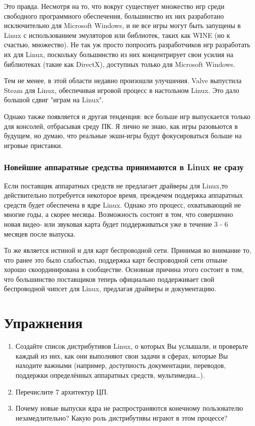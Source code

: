 \documentclass[10pt]{book}
\begin{document}
Это правда. Несмотря на то, что вокруг существует множество игр среди свободного программного обеспечения, большинство их них разработано исключительно для Microsoft Windows, и не все игры могут быть запущены в Linux с использованием эмуляторов или библиотек, таких как WINE (но к счастью, множество). Не так уж просто попросить разработчиков игр разработать их для Linux, поскольку большинство из них концентрирует свои усилия на библиотеках (такие как DirectX), доступных только для Microsoft Windows.

Тем не менее, в этой области недавно произошли улучшения. Valve выпустила Steam для Linux, обеспечивая игровой процесс в настольном Linux. Это дало большой сдвиг "играм на Linux".

Однако также появляется и другая тенденция: все больше игр  выпускается только для консолей, отбрасывая среду ПК. Я лично не знаю, как игры разовьются в будущем, но думаю, что реальные экшн-игры будут фокусироваться больше на игровые приставки.

\subsubsection{Новейшие аппаратные средства принимаются в Linux не сразу}

Если поставщик аппаратных средств не предлагает драйверы для Linux,\quad то действительно потребуется некоторое время, прежде\quad чем поддержка аппаратных средств будет обеспечена в ядре Linux. Однако это процесс, охватывающий не многие годы, а скорее месяцы. Возможность состоит в том, что совершенно новая видео- или звуковая карта будет поддерживаться уже в течение 3 - 6 месяцев после выпуска.

То же является истиной и для карт беспроводной сети. Принимая во внимание то, что ранее это было слабостью, поддержка карт беспроводной сети отныне хорошо скоординирована в сообществе. Основная причина этого состоит в том, что большинство поставщиков теперь официально поддерживает свой беспроводной чипсет для Linux, предлагая драйверы и документацию.

\newpage
{\color{white}\section{Упражнения}}
\begin{tcolorbox}[title=\textbf{Упражнения}, colback=yellow!14!white, colframe=red!75!white]
\begin{enumerate}
	\item Создайте список дистрибутивов Linux, о которых Вы услышали, и проверьте каждый из них, как они выполняют свои задачи в сферах, которые Вы находите важными (например, доступность документации, переводов, поддержки определённых аппаратных средств, мультимедиа\ldots).
	\item Перечислите 7 архитектур ЦП.
	\item Почему новые выпуски ядра не распространяются конечному пользователю незамедлительно? Какую роль дистрибутивы играют в этом процессе?
\end{enumerate}
\end{tcolorbox}
\end{document}
